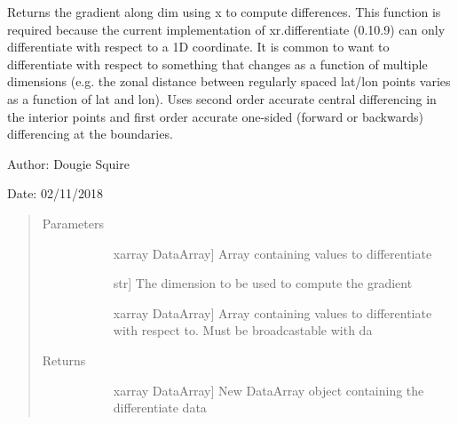 \documentclass[letterpaper,10pt,english]{sphinxmanual}
\begin{document}
\begin{fulllineitems}
\label{\detokenize{utils_doc:utils.differentiate_wrt}}
Returns the gradient along dim using x to compute differences. This function is required                 because the current implementation of xr.differentiate (0.10.9) can only differentiate with                 respect to a 1D coordinate. It is common to want to differentiate with respect to something                 that changes as a function of multiple dimensions (e.g. the zonal distance between regularly                 spaced lat/lon points varies as a function of lat and lon). Uses second order accurate central                 differencing in the interior points and first order accurate one-sided (forward or backwards)                 differencing at the boundaries.

\begin{DUlineblock}{0em}
\item[] Author: Dougie Squire
\item[] Date: 02/11/2018
\end{DUlineblock}
\begin{quote}\begin{description}
\item[{Parameters}] \leavevmode\begin{description}
\item[{}] \leavevmode{[}xarray DataArray{]}
Array containing values to differentiate

\item[{}] \leavevmode{[}str{]}
The dimension to be used to compute the gradient

\item[{}] \leavevmode{[}xarray DataArray{]}
Array containing values to differentiate with respect to. Must be broadcastable with da

\end{description}

\item[{Returns}] \leavevmode\begin{description}
\item[{}] \leavevmode{[}xarray DataArray{]}
New DataArray object containing the differentiate data

\end{description}


\end{description}
\end{quote}
\end{fulllineitems}
\end{document}
